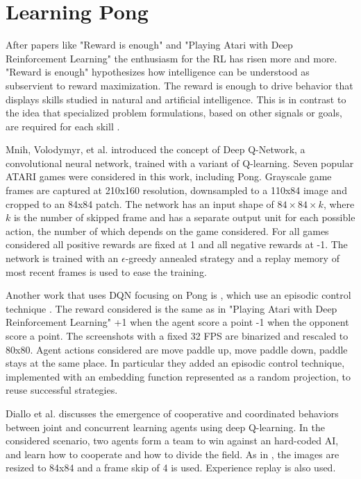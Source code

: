 \section{Learning Pong}
After papers like "Reward is enough"\cite{silver2021reward} and "Playing Atari with Deep Reinforcement Learning"\cite{mnih2013playing} the enthusiasm for the RL has risen more and more.
"Reward is enough" hypothesizes how intelligence can be understood as subservient to reward maximization. The reward is enough to drive behavior that displays skills studied in natural and artificial intelligence. This is in contrast to the idea that specialized problem formulations, based on other signals or goals, are required for each skill \cite{silver2021reward}.

Mnih, Volodymyr, et al. \cite{mnih2013playing} introduced the concept of Deep Q-Network, a convolutional neural network, trained with a variant of Q-learning.
Seven popular ATARI games were considered in this work, including Pong.
%
Grayscale game frames are captured at 210x160 resolution, downsampled to a 110x84 image and cropped to an 84x84 patch.
%
The network has an input shape of $84\times 84\times k$, where $k$ is the number of skipped frame and has a separate output unit for each possible action, 
the number of which depends on the game considered. 
For all games considered all positive rewards are fixed at 1 and all negative rewards at -1.
%
The network is trained with an $\epsilon$-greedy annealed strategy and a replay memory of most recent frames is used to ease the training.

Another work that uses DQN focusing on Pong is \cite{makarov2017learning}, which use an episodic control technique \cite{blundell2016model}.
%
The reward considered is the same as in "Playing Atari with Deep Reinforcement Learning" +1 when the agent score a point -1 when the opponent score a point.
The screenshots with a fixed 32 FPS are binarized and rescaled to 80x80.
Agent actions considered are move paddle up, move paddle down, paddle stays at the same place.
In particular they added an episodic control technique, implemented with an embedding function represented as a random projection, to reuse successful strategies.


Diallo et al. \cite{diallo2017learning} discusses the emergence of cooperative and coordinated behaviors between joint and concurrent learning
agents using deep Q-learning. 
%
In the considered scenario, two agents form a team to win against an hard-coded AI,
and learn how to cooperate and how to divide the field.
%
As in \cite{mnih2013playing}, the images are resized to 84x84 and a frame skip of 4 is used.
Experience replay is also used.

